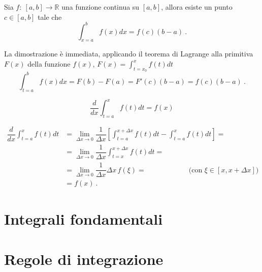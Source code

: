 \begin{theorem}
    Sia $f: \ [a,b] \rightarrow \mathbb{R}$ una funzione continua su $[a,b]$, allora esiste un punto $c \in [a,b]$ tale che
    \begin{equation}
        \int_{x=a}^{b} f(x) dx = f(c) (b-a) \ .
    \end{equation}
\end{theorem}
La dimostrazione è immediata, applicando il teorema di Lagrange alla primitiva $F(x)$ della funzione $f(x)$, $F(x) = \int_{t=x_0}^{x} f(t) dt$ 
\begin{equation}
    \int_{t=a}^{b} f(x) dx = F(b) - F(a) = F'(c) (b-a) = f(c) (b-a) \ .
\end{equation}


\begin{theorem}
    \begin{equation}
        \dfrac{d}{dx} \int_{t=a}^{x} f(t) dt = f(x)
    \end{equation}
\end{theorem}
\begin{equation}
    \begin{aligned}
        \dfrac{d}{dx} \int_{t=a}^{x} f(t) dt & = 
        \lim_{\Delta x \rightarrow 0} \dfrac{1}{\Delta x} \left[ \int_{t=a}^{x+\Delta x} f(t) dt - \int_{t=a}^{x} f(t) dt\right] = \\
        & = \lim_{\Delta x \rightarrow 0} \dfrac{1}{\Delta x} \int_{t=x}^{x+\Delta x} f(t) dt = \\
        & = \lim_{\Delta x \rightarrow 0} \dfrac{1}{\Delta x} \Delta x \, f(\xi) = \qquad \qquad \qquad \text{(con $\xi \in [x, x+\Delta x]$)} \\
        & = f(x)  \  .
    \end{aligned}
\end{equation}

\section{Integrali fondamentali}

\section{Regole di integrazione}
